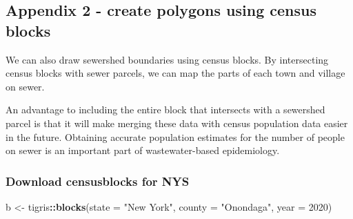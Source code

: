 \documentclass[
]{book}
\newenvironment{Shaded}{\begin{snugshade}}{\end{snugshade}}
\newcommand{\AttributeTok}[1]{\textcolor[rgb]{0.13,0.29,0.53}{#1}}
\newcommand{\DecValTok}[1]{\textcolor[rgb]{0.00,0.00,0.81}{#1}}
\newcommand{\FunctionTok}[1]{\textcolor[rgb]{0.13,0.29,0.53}{\textbf{#1}}}
\newcommand{\NormalTok}[1]{#1}
\newcommand{\OtherTok}[1]{\textcolor[rgb]{0.56,0.35,0.01}{#1}}
\newcommand{\SpecialCharTok}[1]{\textcolor[rgb]{0.81,0.36,0.00}{\textbf{#1}}}
\newcommand{\StringTok}[1]{\textcolor[rgb]{0.31,0.60,0.02}{#1}}
\begin{document}
\subsection{Appendix 2 - create polygons using census blocks}\label{appendix-2---create-polygons-using-census-blocks}

We can also draw sewershed boundaries using census blocks. By intersecting census blocks with sewer parcels, we can map the parts of each town and village on sewer.

An advantage to including the entire block that intersects with a sewershed parcel is that it will make merging these data with census population data easier in the future. Obtaining accurate population estimates for the number of people on sewer is an important part of wastewater-based epidemiology.

\subsubsection{Download censusblocks for NYS}\label{download-censusblocks-for-nys}

\begin{Shaded}
\begin{Highlighting}[]
\NormalTok{b }\OtherTok{\textless{}{-}}\NormalTok{ tigris}\SpecialCharTok{::}\FunctionTok{blocks}\NormalTok{(}\AttributeTok{state =} \StringTok{"New York"}\NormalTok{, }\AttributeTok{county =} \StringTok{"Onondaga"}\NormalTok{, }\AttributeTok{year =} \DecValTok{2020}\NormalTok{)}
\end{Highlighting}
\end{Shaded}
\end{document}

